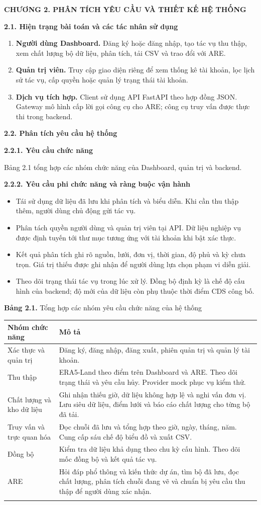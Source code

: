 \documentclass[12pt,a4paper]{article}
\newcommand{\pg}[1]{\newpage\pagenumbering{arabic}\setcounter{page}{#1}\thispagestyle{fancy}}
\newcommand{\heading}[1]{\par\medskip\noindent\textbf{#1}\par\nopagebreak}
\newcommand{\chaptertitle}[1]{\begin{center}\large\bfseries #1\end{center}}
\newcommand{\captext}[1]{\begin{center}\small #1\end{center}}
\newcommand{\pair}[2]{#1 & #2\\\addlinespace[4pt]}
\begin{document}
\pg{12}
\chaptertitle{CHƯƠNG 2. PHÂN TÍCH YÊU CẦU VÀ THIẾT KẾ HỆ THỐNG}
\heading{2.1. Hiện trạng bài toán và các tác nhân sử dụng}
\begin{enumerate}
\item \textbf{Người dùng Dashboard.} Đăng ký hoặc đăng nhập, tạo tác vụ thu thập, xem chất lượng bộ dữ liệu, phân tích, tải CSV và trao đổi với ARE.
\item \textbf{Quản trị viên.} Truy cập giao diện riêng để xem thống kê tài khoản, lọc lịch sử tác vụ, cấp quyền hoặc quản lý trạng thái tài khoản.
\item \textbf{Dịch vụ tích hợp.} Client sử dụng API FastAPI theo hợp đồng JSON. Gateway mô hình cấp lời gọi công cụ cho ARE; công cụ truy vấn được thực thi trong backend.
\end{enumerate}
\heading{2.2. Phân tích yêu cầu hệ thống}
\heading{2.2.1. Yêu cầu chức năng}
Bảng 2.1 tổng hợp các nhóm chức năng của Dashboard, quản trị và backend.
\heading{2.2.2. Yêu cầu phi chức năng và ràng buộc vận hành}
\begin{itemize}
\item Tái sử dụng dữ liệu đã lưu khi phân tích và biểu diễn. Khi cần thu thập thêm, người dùng chủ động gửi tác vụ.
\item Phân tách quyền người dùng và quản trị viên tại API. Dữ liệu nghiệp vụ được định tuyến tới thư mục tương ứng với tài khoản khi bật xác thực.
\item Kết quả phân tích ghi rõ nguồn, lưới, đơn vị, thời gian, độ phủ và kỳ chưa trọn. Giá trị thiếu được ghi nhận để người dùng lựa chọn phạm vi diễn giải.
\item Theo dõi trạng thái tác vụ trong lúc xử lý. Đồng bộ định kỳ là chế độ cấu hình của backend; độ mới của dữ liệu còn phụ thuộc thời điểm CDS công bố.
\end{itemize}
\pg{13}
\captext{\textbf{Bảng 2.1.} Tổng hợp các nhóm yêu cầu chức năng của hệ thống}
\begin{tabularx}{\linewidth}{@{}p{.24\linewidth}X@{}}
\toprule Nhóm chức năng & Mô tả\\\midrule
\pair{Xác thực và quản trị}{Đăng ký, đăng nhập, đăng xuất, phiên quản trị và quản lý tài khoản.}
\pair{Thu thập}{ERA5-Land theo điểm trên Dashboard và ARE. Theo dõi trạng thái và yêu cầu hủy. Provider mock phục vụ kiểm thử.}
\pair{Chất lượng và kho dữ liệu}{Ghi nhận thiếu giờ, dữ liệu không hợp lệ và nghi vấn đơn vị. Lưu siêu dữ liệu, điểm lưới và báo cáo chất lượng cho từng bộ đã tải.}
\pair{Truy vấn và trực quan hóa}{Đọc chuỗi đã lưu và tổng hợp theo giờ, ngày, tháng, năm. Cung cấp sáu chế độ biểu đồ và xuất CSV.}
\pair{Đồng bộ}{Kiểm tra dữ liệu khả dụng theo chu kỳ cấu hình. Theo dõi mốc đồng bộ và kết quả tác vụ.}
\pair{ARE}{Hỏi đáp phổ thông và kiến thức dự án, tìm bộ đã lưu, đọc chất lượng, phân tích chuỗi đang vẽ và chuẩn bị yêu cầu thu thập để người dùng xác nhận.}
\bottomrule
\end{tabularx}
\end{document}
